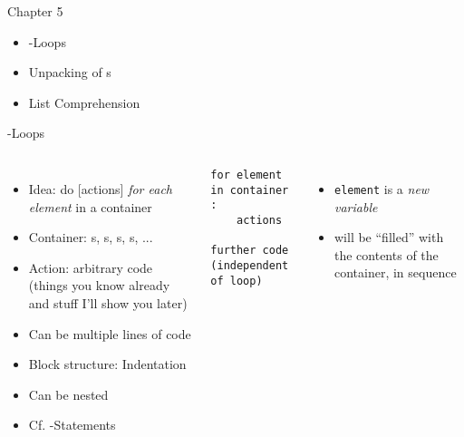 
\begin{frame}{Chapter 5}
%
\begin{itemize}
\item {}-Loops
\item Unpacking of s
\item List Comprehension
\end{itemize}
%
\end{frame}


\begin{frame}[fragile]{-Loops}
%
\vspace{-15pt}
\begin{columns}[t]
\begin{itemize}
\item Idea: do [actions] \emph{for each element} in a container
\item Container: s, s, s, s, ...
\item Action: arbitrary code (things you know already and stuff I'll show you later)
\item Can be multiple lines of code
\item[\Thus] Block structure: Indentation
\item Can be nested
\item Cf. -Statements
\end{itemize}
%
\begin{codebox}
\begin{verbatim}
for element in container :
    actions

further code (independent of loop)
\end{verbatim}
\end{codebox}
%
\begin{itemize}
\item \texttt{element} is a \emph{new variable}
\item will be \enquote{filled} with the contents of the container, in sequence
\end{itemize}
\end{columns}
%
\end{frame}



